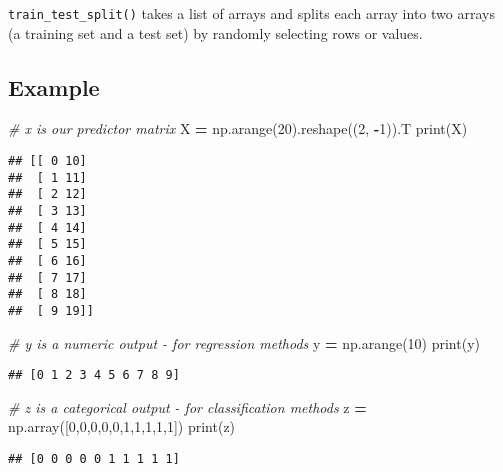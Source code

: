 \documentclass[
]{book}
\newenvironment{Shaded}{\begin{snugshade}}{\end{snugshade}}
\newcommand{\BuiltInTok}[1]{#1}
\newcommand{\CommentTok}[1]{\textcolor[rgb]{0.56,0.35,0.01}{\textit{#1}}}
\newcommand{\DecValTok}[1]{\textcolor[rgb]{0.00,0.00,0.81}{#1}}
\newcommand{\NormalTok}[1]{#1}
\newcommand{\OperatorTok}[1]{\textcolor[rgb]{0.81,0.36,0.00}{\textbf{#1}}}
\begin{document}
\texttt{train\_test\_split()} takes a list of arrays and splits each array into two arrays (a training set and a test set) by randomly selecting rows or values.

\hypertarget{example}{%
\subsection{Example}\label{example}}

\begin{Shaded}
\begin{Highlighting}[]
\CommentTok{\# x is our predictor matrix}
\NormalTok{X }\OperatorTok{=}\NormalTok{ np.arange(}\DecValTok{20}\NormalTok{).reshape((}\DecValTok{2}\NormalTok{, }\OperatorTok{{-}}\DecValTok{1}\NormalTok{)).T}
\BuiltInTok{print}\NormalTok{(X)}
\end{Highlighting}
\end{Shaded}

\begin{verbatim}
## [[ 0 10]
##  [ 1 11]
##  [ 2 12]
##  [ 3 13]
##  [ 4 14]
##  [ 5 15]
##  [ 6 16]
##  [ 7 17]
##  [ 8 18]
##  [ 9 19]]
\end{verbatim}

\begin{Shaded}
\begin{Highlighting}[]
\CommentTok{\# y is a numeric output {-} for regression methods}
\NormalTok{y }\OperatorTok{=}\NormalTok{ np.arange(}\DecValTok{10}\NormalTok{)}
\BuiltInTok{print}\NormalTok{(y)}
\end{Highlighting}
\end{Shaded}

\begin{verbatim}
## [0 1 2 3 4 5 6 7 8 9]
\end{verbatim}

\begin{Shaded}
\begin{Highlighting}[]
\CommentTok{\# z is a categorical output {-} for classification methods}
\NormalTok{z }\OperatorTok{=}\NormalTok{ np.array([}\DecValTok{0}\NormalTok{,}\DecValTok{0}\NormalTok{,}\DecValTok{0}\NormalTok{,}\DecValTok{0}\NormalTok{,}\DecValTok{0}\NormalTok{,}\DecValTok{1}\NormalTok{,}\DecValTok{1}\NormalTok{,}\DecValTok{1}\NormalTok{,}\DecValTok{1}\NormalTok{,}\DecValTok{1}\NormalTok{])}
\BuiltInTok{print}\NormalTok{(z)}
\end{Highlighting}
\end{Shaded}

\begin{verbatim}
## [0 0 0 0 0 1 1 1 1 1]
\end{verbatim}
\end{document}

